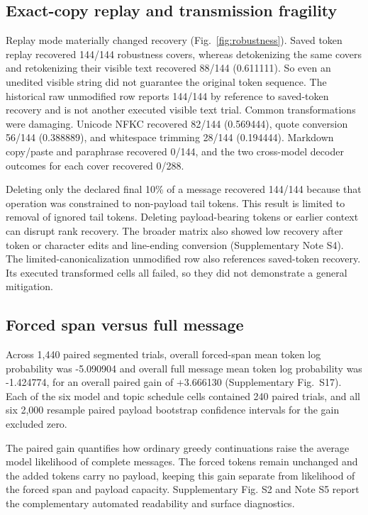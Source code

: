 \documentclass[fleqn,10pt]{wlscirep}
\begin{document}
\subsection*{Exact-copy replay and transmission fragility}\label{sec:results-robustness}

Replay mode materially changed recovery (Fig.~\ref{fig:robustness}). Saved token replay recovered 144/144 robustness covers, whereas detokenizing the same covers and retokenizing their visible text recovered 88/144 (0.611111). So even an unedited visible string did not guarantee the original token sequence. The historical raw unmodified row reports 144/144 by reference to saved-token recovery and is not another executed visible text trial. Common transformations were damaging. Unicode NFKC recovered 82/144 (0.569444), quote conversion 56/144 (0.388889), and whitespace trimming 28/144 (0.194444). Markdown copy/paste and paraphrase recovered 0/144, and the two cross-model decoder outcomes for each cover recovered 0/288.


Deleting only the declared final 10\% of a message recovered 144/144 because that operation was constrained to non-payload tail tokens. This result is limited to removal of ignored tail tokens. Deleting payload-bearing tokens or earlier context can disrupt rank recovery. The broader matrix also showed low recovery after token or character edits and line-ending conversion (Supplementary Note S4). The limited-canonicalization unmodified row also references saved-token recovery. Its executed transformed cells all failed, so they did not demonstrate a general mitigation.





\subsection*{Forced span versus full message}\label{sec:results-quality}

Across 1,440 paired segmented trials, overall forced-span mean token log probability was -5.090904 and overall full message mean token log probability was -1.424774, for an overall paired gain of +3.666130 (Supplementary Fig.~S17). Each of the six model and topic schedule cells contained 240 paired trials, and all six 2,000 resample paired payload bootstrap confidence intervals for the gain excluded zero.

The paired gain quantifies how ordinary greedy continuations raise the average model likelihood of complete messages. The forced tokens remain unchanged and the added tokens carry no payload, keeping this gain separate from likelihood of the forced span and payload capacity. Supplementary Fig. S2 and Note S5 report the complementary automated readability and surface diagnostics.
\end{document}
